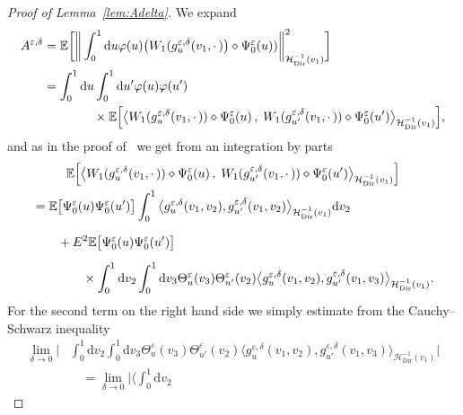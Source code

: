 \documentclass[AHL,Unicode,longabstracts]{cedram}
\DeclareMathOperator{\Dir}{Dir}
\newcommand{\mc}[1]{{\mathcal #1}}
\renewcommand{\mc}[1]{{\mathcal #1}}
\newcommand*{\dd}{\mathrm{d}}
\newcommand*{\du}{\dd u}
\newcommand*{\dv}{\dd v}
\begin{document}
\begin{proof}[Proof of Lemma~\ref{lem:Adelta}]
We expand
\begin{align}
A^{\varepsilon,\delta}& = \mathbb{E} \bigg[\bigg\| \int_0^1 \du \varphi (u) \big(W_1 (g^{\varepsilon, \delta}_u (v_1, \cdot\,)\big) \diamond \Psi^{\varepsilon}_0 (u)) \bigg\|_{\mc H_{\Dir}^{- 1} (v_1)}^2 \bigg] \notag\\
& = \int_0^1 \du \int_0^1 \du' \varphi (u) \varphi (u') \notag
\\
& \qquad \qquad \times \mathbb{E} \Big[\big\langle W_1 (g^{\varepsilon, \delta}_u (v_1, \cdot\,))
\diamond \Psi^{\varepsilon}_0 (u)\,,\; W_1 (g^{\varepsilon, \delta}_{u'} (v_1,
\cdot\,)) \diamond \Psi^{\varepsilon}_0 (u') \big\rangle_{\mc H_{\Dir}^{- 1} (v_1)}\Big],\label{eq:Aest}
\end{align}
and as in the proof of~\cite[Lemma~4.7]{Gubinelli2015Energy} we get from an integration by parts
\begin{multline}\label{eq:A-eps-delta-pr1}
\mathbb{E} \Big[\big\langle W_1 (g^{\varepsilon, \delta}_u (v_1, \cdot\,))\diamond \Psi^{\varepsilon}_0 (u)\,,\; W_1 (g^{\varepsilon, \delta}_{u'} (v_1,\cdot\,)) \diamond \Psi^{\varepsilon}_0 (u') \big\rangle_{\mc H_{\Dir}^{- 1} (v_1)} \Big] \\
\begin{aligned}
&=\mathbb{E} \big[\Psi^{\varepsilon}_0 (u) \Psi^{\varepsilon}_0 (u')\big] \int_0^1
\big\langle g^{\varepsilon, \delta}_u (v_1, v_2), g^{\varepsilon, \delta}_{u'} (v_1, v_2) \big\rangle_{\mc H_{\Dir}^{- 1}(v_1)} \dv_2\\
&\quad \quad + E^2 \mathbb{E} \big[\Psi^{\varepsilon}_0 (u) \Psi^{\varepsilon}_0 (u')\big] \vphantom{\int_0^1}\\
& \qquad \qquad \times \int_0^1 \dv_2 \int_0^1 \dv_3 \Theta^{\varepsilon}_u (v_3)
\Theta^{\varepsilon}_{u'} (v_2) \big\langle g^{\varepsilon, \delta}_u (v_1, v_2), g^{\varepsilon, \delta}_{u'} (v_1, v_3) \big\rangle_{\mc H_{\Dir}^{- 1}(v_1)}.
\end{aligned}
\end{multline}
For the second term on the right hand side we simply estimate from the Cauchy--Schwarz inequality
\begin{align*}
\lim_{\delta \rightarrow 0} \bigg| &\int_0^1 \dv_2 \int_0^1 \dv_3
\Theta^{\varepsilon}_u (v_3) \Theta^{\varepsilon}_{u'} (v_2) \big\langle g^{\varepsilon, \delta}_u (v_1, v_2), g^{\varepsilon, \delta}_{u'} (v_1, v_3) \big\rangle_{\mc H_{\Dir}^{- 1} (v_1)} \bigg|\\
&\quad = \lim_{\delta \rightarrow 0} \bigg| \bigg\langle \int_0^1 \dv_2

\end{align*}
\end{proof}
\end{document}
